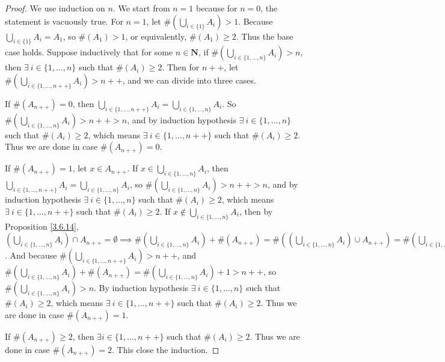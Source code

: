 \begin{proof}
We use induction on \(n\).
We start from \(n = 1\) because for \(n = 0\), the statement is vacuously true.
For \(n = 1\), let \(\#(\bigcup_{i \in \{1\}} A_i) > 1\).
Because \(\bigcup_{i \in \{1\}} A_i = A_1\), so \(\#(A_1) > 1\), or equivalently, \(\#(A_1) \geq 2\).
Thus the base case holds.
Suppose inductively that for some \(n \in \mathbf{N}\), if \(\#(\bigcup_{i \in \{1, \dots, n\}} A_i) > n\), then \(\exists\ i \in \{1, \dots, n\}\) such that \(\#(A_i) \geq 2\).
Then for \(n++\), let \(\#(\bigcup_{i \in \{1, \dots, n++\}} A_i) > n++\), and we can divide into three cases.

If \(\#(A_{n++}) = 0\), then \(\bigcup_{i \in \{1, \dots, n++\}} A_i = \bigcup_{i \in \{1, \dots, n\}} A_i\).
So \(\#(\bigcup_{i \in \{1, \dots, n\}} A_i) > n++ > n\), and by induction hypothesis \(\exists\ i \in \{1, \dots, n\}\) such that \(\#(A_i) \geq 2\), which means \(\exists\ i \in \{1, \dots, n++\}\) such that \(\#(A_i) \geq 2\).
Thus we are done in case \(\#(A_{n++}) = 0\).

If \(\#(A_{n++}) = 1\), let \(x \in A_{n++}\).
If \(x \in \bigcup_{i \in \{1, \dots, n\}} A_i\), then \(\bigcup_{i \in \{1, \dots, n++\}} A_i = \bigcup_{i \in \{1, \dots, n\}} A_i\), so \(\#(\bigcup_{i \in \{1, \dots, n\}} A_i) > n++ > n\), and by induction hypothesis \(\exists\ i \in \{1, \dots, n\}\) such that \(\#(A_i) \geq 2\), which means \(\exists\ i \in \{1, \dots, n++\}\) such that \(\#(A_i) \geq 2\).
If \(x \notin \bigcup_{i \in \{1, \dots, n\}} A_i\), then by Proposition \ref{3.6.14}, \((\bigcup_{i \in \{1, \dots, n\}} A_i) \cap A_{n++} = \emptyset \implies \#(\bigcup_{i \in \{1, \dots, n\}} A_i) + \#(A_{n++}) = \#((\bigcup_{i \in \{1, \dots, n\}} A_i) \cup A_{n++}) = \#(\bigcup_{i \in \{1, \dots, n++\}} A_i)\).
And because \(\#(\bigcup_{i \in \{1, \dots, n++\}} A_i) > n++\), and \(\#(\bigcup_{i \in \{1, \dots, n\}} A_i) + \#(A_{n++}) = \#(\bigcup_{i \in \{1, \dots, n\}} A_i) + 1 > n++\), so \(\#(\bigcup_{i \in \{1, \dots, n\}} A_i) > n\).
By induction hypothesis \(\exists\ i \in \{1, \dots, n\}\) such that \(\#(A_i) \geq 2\), which means \(\exists\ i \in \{1, \dots, n++\}\) such that \(\#(A_i) \geq 2\).
Thus we are done in case \(\#(A_{n++}) = 1\).

If \(\#(A_{n++}) \geq 2\), then \(\exists i \in \{1, \dots, n++\}\) such that \(\#(A_i) \geq 2\).
Thus we are done in case \(\#(A_{n++}) = 2\).
This close the induction.
\end{proof}